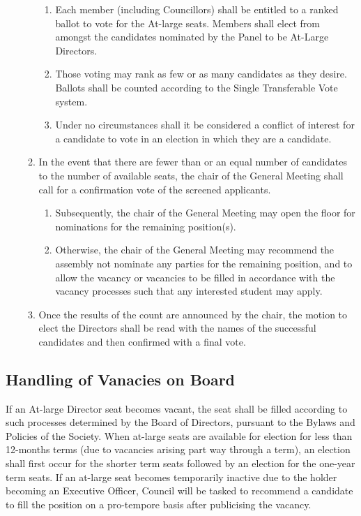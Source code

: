 \begin{enumerate}
\begin{enumerate}
        \begin{enumerate}
            \item Each member (including Councillors) shall be entitled to a ranked ballot to vote for the At-large seats. 
                Members shall elect from amongst the candidates nominated by the Panel to be At-Large Directors.
            \item Those voting may rank as few or as many candidates as they desire. 
                Ballots shall be counted according to the Single Transferable Vote system. 
            \item Under no circumstances shall it be considered a conflict of interest for a candidate 
                to vote in an election in which they are a candidate.
        \end{enumerate}
        \item In the event that there are fewer than or an equal number of candidates to the 
            number of available seats, the chair of the General Meeting shall call for a 
            confirmation vote of the screened applicants.
        \begin{enumerate}
            \item Subsequently, the chair of the General Meeting may open the floor 
                for nominations for the remaining position(s).
            \item Otherwise, the chair of the General Meeting may recommend the assembly not 
                nominate any parties for the remaining position, and to allow the vacancy or 
                vacancies to be filled in accordance with the vacancy processes such that 
                any interested student may apply.
        \end{enumerate}
        \item Once the results of the count are announced by the chair, the motion to elect 
            the Directors shall be read with the names of the successful candidates 
            and then confirmed with a final vote. 

    \end{enumerate}
\end{enumerate}

\subsection{Handling of Vanacies on Board}

If an At-large Director seat becomes vacant, the seat shall be filled according to such processes determined by the Board of Directors, pursuant to the Bylaws and Policies of the Society.
When at-large seats are available for election for less than 12-months terms (due to vacancies arising part way through a term), an election shall first occur for the shorter term seats followed by an election for the one-year term seats.
If an at-large seat becomes temporarily inactive due to the holder becoming an Executive Officer, Council will be tasked to recommend a candidate to fill the position on a pro-tempore basis after publicising the vacancy.




